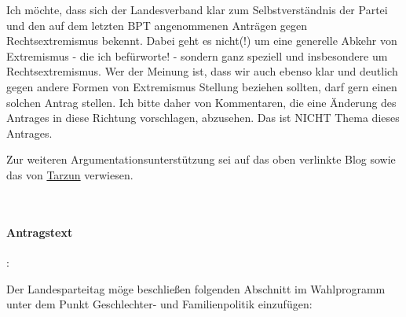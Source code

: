 Ich möchte, dass sich der Landesverband klar zum Selbstverständnis der Partei und den auf dem letzten BPT angenommenen Anträgen gegen Rechtsextremismus bekennt. Dabei geht es nicht(!) um eine generelle Abkehr von Extremismus - die ich befürworte! - sondern ganz speziell und insbesondere um Rechtsextremismus. Wer der Meinung ist, dass wir auch ebenso klar und deutlich gegen andere Formen von Extremismus Stellung beziehen sollten, darf gern einen solchen Antrag stellen. Ich bitte daher von Kommentaren, die eine Änderung des Antrages in diese Richtung vorschlagen, abzusehen. Das ist NICHT Thema dieses Antrages.

Zur weiteren Argumentationsunterstützung sei auf das oben verlinkte Blog sowie das von \href{http://tarzun.de/archives/423-Das-Problem-heisst-nicht-Kevin.html}{Tarzun} verwiesen.


\\

\paragraph{Antragstext}:

Der Landesparteitag möge beschließen folgenden Abschnitt im Wahlprogramm unter dem Punkt {\Gu}Geschlechter- und Familienpolitik{\Go} einzufügen:

